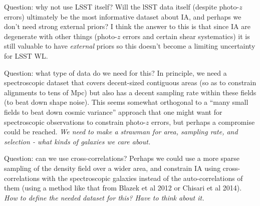 Question: why not use LSST itself?  Will the lSST data itself (despite photo-$z$ errors) ultimately
be the most informative dataset about IA, and perhaps we don't need strong external priors?  I think
the answer to this is that since IA are degenerate with other things (photo-$z$ errors and certain
shear systematics) it is still valuable to have {\em external} priors so this doesn't become a
limiting uncertainty for LSST WL.

Question: what type of data do we need for this?  In principle, we need a spectroscopic dataset that
covers decent-sized contiguous areas (so as to constrain alignments to tens of Mpc) but also has a
decent sampling rate within these fields (to beat down shape noise).  This seems somewhat orthogonal
to a ``many small fields to beat down cosmic variance'' approach that one might want for
spectroscopic observations to constrain photo-$z$ errors, but perhaps a compromise could be
reached.  {\em We need to make a strawman for area, sampling rate, and selection - what kinds of
  galaxies we care about.}

Question: can we use cross-correlations?  Perhaps we could use a more sparse sampling of the density
field over a wider area, and constrain IA using cross-correlations with the spectroscopic galaxies
instead of the auto-correlations of them (using a method like that from Blazek et al 2012 or Chisari
et al 2014).  {\em How to define the needed dataset for this?  Have to think about it.}
